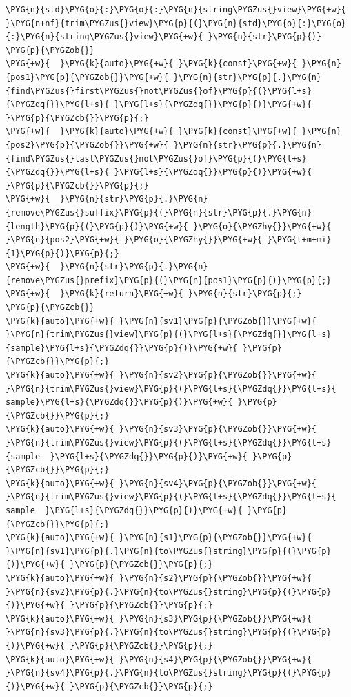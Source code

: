 \begin{codeblockbg}
\begin{Verbatim}[commandchars=\\\{\},breaklines=true,breakanywhere=true,fontsize=\codefont,xleftmargin=17bp]
\PYG{n}{std}\PYG{o}{:}\PYG{o}{:}\PYG{n}{string\PYGZus{}view}\PYG{+w}{ }\PYG{n+nf}{trim\PYGZus{}view}\PYG{p}{(}\PYG{n}{std}\PYG{o}{:}\PYG{o}{:}\PYG{n}{string\PYGZus{}view}\PYG{+w}{ }\PYG{n}{str}\PYG{p}{)}
\PYG{p}{\PYGZob{}}
\PYG{+w}{  }\PYG{k}{auto}\PYG{+w}{ }\PYG{k}{const}\PYG{+w}{ }\PYG{n}{pos1}\PYG{p}{\PYGZob{}}\PYG{+w}{ }\PYG{n}{str}\PYG{p}{.}\PYG{n}{find\PYGZus{}first\PYGZus{}not\PYGZus{}of}\PYG{p}{(}\PYG{l+s}{\PYGZdq{}}\PYG{l+s}{ }\PYG{l+s}{\PYGZdq{}}\PYG{p}{)}\PYG{+w}{ }\PYG{p}{\PYGZcb{}}\PYG{p}{;}
\PYG{+w}{  }\PYG{k}{auto}\PYG{+w}{ }\PYG{k}{const}\PYG{+w}{ }\PYG{n}{pos2}\PYG{p}{\PYGZob{}}\PYG{+w}{ }\PYG{n}{str}\PYG{p}{.}\PYG{n}{find\PYGZus{}last\PYGZus{}not\PYGZus{}of}\PYG{p}{(}\PYG{l+s}{\PYGZdq{}}\PYG{l+s}{ }\PYG{l+s}{\PYGZdq{}}\PYG{p}{)}\PYG{+w}{ }\PYG{p}{\PYGZcb{}}\PYG{p}{;}
\PYG{+w}{  }\PYG{n}{str}\PYG{p}{.}\PYG{n}{remove\PYGZus{}suffix}\PYG{p}{(}\PYG{n}{str}\PYG{p}{.}\PYG{n}{length}\PYG{p}{(}\PYG{p}{)}\PYG{+w}{ }\PYG{o}{\PYGZhy{}}\PYG{+w}{ }\PYG{n}{pos2}\PYG{+w}{ }\PYG{o}{\PYGZhy{}}\PYG{+w}{ }\PYG{l+m+mi}{1}\PYG{p}{)}\PYG{p}{;}
\PYG{+w}{  }\PYG{n}{str}\PYG{p}{.}\PYG{n}{remove\PYGZus{}prefix}\PYG{p}{(}\PYG{n}{pos1}\PYG{p}{)}\PYG{p}{;}
\PYG{+w}{  }\PYG{k}{return}\PYG{+w}{ }\PYG{n}{str}\PYG{p}{;}
\PYG{p}{\PYGZcb{}}
\PYG{k}{auto}\PYG{+w}{ }\PYG{n}{sv1}\PYG{p}{\PYGZob{}}\PYG{+w}{ }\PYG{n}{trim\PYGZus{}view}\PYG{p}{(}\PYG{l+s}{\PYGZdq{}}\PYG{l+s}{sample}\PYG{l+s}{\PYGZdq{}}\PYG{p}{)}\PYG{+w}{ }\PYG{p}{\PYGZcb{}}\PYG{p}{;}
\PYG{k}{auto}\PYG{+w}{ }\PYG{n}{sv2}\PYG{p}{\PYGZob{}}\PYG{+w}{ }\PYG{n}{trim\PYGZus{}view}\PYG{p}{(}\PYG{l+s}{\PYGZdq{}}\PYG{l+s}{  sample}\PYG{l+s}{\PYGZdq{}}\PYG{p}{)}\PYG{+w}{ }\PYG{p}{\PYGZcb{}}\PYG{p}{;}
\PYG{k}{auto}\PYG{+w}{ }\PYG{n}{sv3}\PYG{p}{\PYGZob{}}\PYG{+w}{ }\PYG{n}{trim\PYGZus{}view}\PYG{p}{(}\PYG{l+s}{\PYGZdq{}}\PYG{l+s}{sample  }\PYG{l+s}{\PYGZdq{}}\PYG{p}{)}\PYG{+w}{ }\PYG{p}{\PYGZcb{}}\PYG{p}{;}
\PYG{k}{auto}\PYG{+w}{ }\PYG{n}{sv4}\PYG{p}{\PYGZob{}}\PYG{+w}{ }\PYG{n}{trim\PYGZus{}view}\PYG{p}{(}\PYG{l+s}{\PYGZdq{}}\PYG{l+s}{  sample  }\PYG{l+s}{\PYGZdq{}}\PYG{p}{)}\PYG{+w}{ }\PYG{p}{\PYGZcb{}}\PYG{p}{;}
\PYG{k}{auto}\PYG{+w}{ }\PYG{n}{s1}\PYG{p}{\PYGZob{}}\PYG{+w}{ }\PYG{n}{sv1}\PYG{p}{.}\PYG{n}{to\PYGZus{}string}\PYG{p}{(}\PYG{p}{)}\PYG{+w}{ }\PYG{p}{\PYGZcb{}}\PYG{p}{;}
\PYG{k}{auto}\PYG{+w}{ }\PYG{n}{s2}\PYG{p}{\PYGZob{}}\PYG{+w}{ }\PYG{n}{sv2}\PYG{p}{.}\PYG{n}{to\PYGZus{}string}\PYG{p}{(}\PYG{p}{)}\PYG{+w}{ }\PYG{p}{\PYGZcb{}}\PYG{p}{;}
\PYG{k}{auto}\PYG{+w}{ }\PYG{n}{s3}\PYG{p}{\PYGZob{}}\PYG{+w}{ }\PYG{n}{sv3}\PYG{p}{.}\PYG{n}{to\PYGZus{}string}\PYG{p}{(}\PYG{p}{)}\PYG{+w}{ }\PYG{p}{\PYGZcb{}}\PYG{p}{;}
\PYG{k}{auto}\PYG{+w}{ }\PYG{n}{s4}\PYG{p}{\PYGZob{}}\PYG{+w}{ }\PYG{n}{sv4}\PYG{p}{.}\PYG{n}{to\PYGZus{}string}\PYG{p}{(}\PYG{p}{)}\PYG{+w}{ }\PYG{p}{\PYGZcb{}}\PYG{p}{;}
\end{Verbatim}
\end{codeblockbg}


